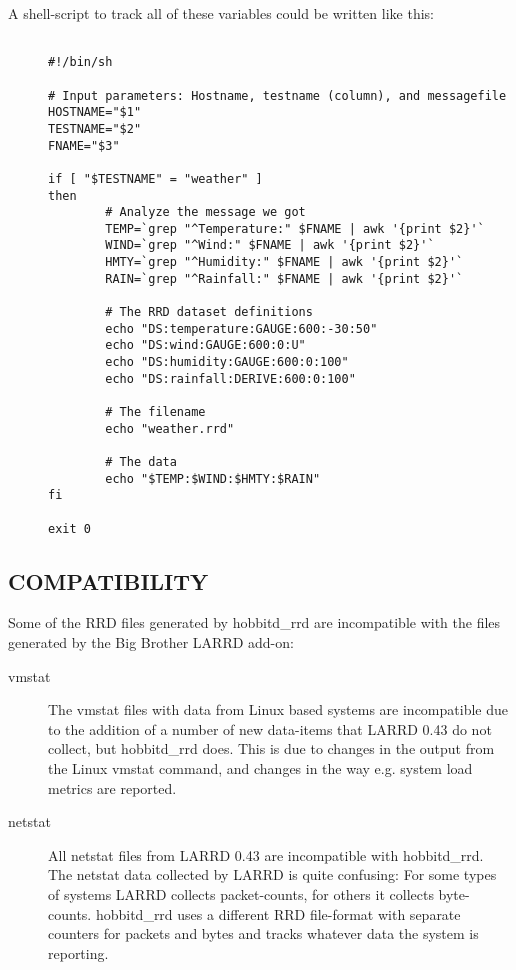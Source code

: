   A shell-script to track all of these variables could be written like this: \begin{description}
\item[]\begin{verbatim}

#!/bin/sh

# Input parameters: Hostname, testname (column), and messagefile
HOSTNAME="$1"
TESTNAME="$2"
FNAME="$3"

if [ "$TESTNAME" = "weather" ]
then
        # Analyze the message we got
        TEMP=`grep "^Temperature:" $FNAME | awk '{print $2}'`
        WIND=`grep "^Wind:" $FNAME | awk '{print $2}'`
        HMTY=`grep "^Humidity:" $FNAME | awk '{print $2}'`
        RAIN=`grep "^Rainfall:" $FNAME | awk '{print $2}'`

        # The RRD dataset definitions
        echo "DS:temperature:GAUGE:600:-30:50"
        echo "DS:wind:GAUGE:600:0:U"
        echo "DS:humidity:GAUGE:600:0:100"
        echo "DS:rainfall:DERIVE:600:0:100"

        # The filename
        echo "weather.rrd"

        # The data
        echo "$TEMP:$WIND:$HMTY:$RAIN"
fi

exit 0

\end{verbatim}


 


 


\end{description}

\subsection{COMPATIBILITY}


  Some of the RRD files generated by hobbitd\_rrd are incompatible
  with the files generated by the Big Brother LARRD add-on: 



\begin{description}

\item[vmstat] The vmstat files with data from Linux based systems are
  incompatible due to the addition of a number of new data-items that
  LARRD 0.43 do not collect, but hobbitd\_rrd does. This is due to
  changes in the output from the Linux vmstat command, and changes in
  the way e.g. system load metrics are reported. 
 

\item[netstat] All netstat files from LARRD 0.43 are incompatible with
  hobbitd\_rrd. The netstat data collected by LARRD is quite
  confusing: For some types of systems LARRD collects packet-counts,
  for others it collects byte- counts. hobbitd\_rrd uses a different
  RRD file-format with separate counters for packets and bytes and
  tracks whatever data the system is reporting. 


 


 


\end{description}

